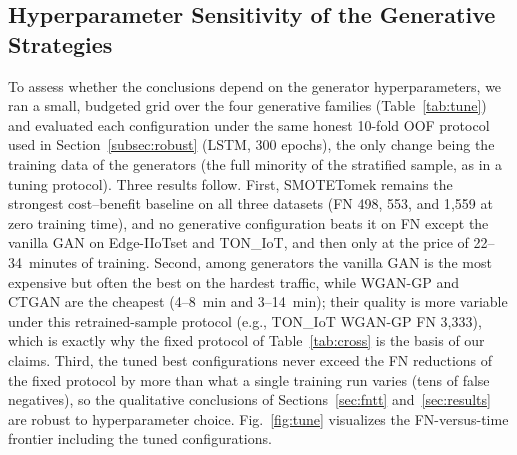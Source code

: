 ﻿\documentclass[journal]{IEEEtran}
\begin{document}
\subsection{Hyperparameter Sensitivity of the Generative Strategies}
\label{sec:tune}

To assess whether the conclusions depend on the generator hyperparameters, we ran a small, budgeted grid over the four generative families (Table~\ref{tab:tune}) and evaluated each configuration under the same honest 10-fold OOF protocol used in Section~\ref{subsec:robust} (LSTM, 300 epochs), the only change being the training data of the generators (the full minority of the stratified sample, as in a tuning protocol). Three results follow. First, SMOTETomek remains the strongest cost--benefit baseline on all three datasets (FN 498, 553, and 1{,}559 at zero training time), and no generative configuration beats it on FN except the vanilla GAN on Edge-IIoTset and TON\_IoT, and then only at the price of 22--34~minutes of training. Second, among generators the vanilla GAN is the most expensive but often the best on the hardest traffic, while WGAN-GP and CTGAN are the cheapest (4--8~min and 3--14~min); their quality is more variable under this retrained-sample protocol (e.g., TON\_IoT WGAN-GP FN 3{,}333), which is exactly why the fixed protocol of Table~\ref{tab:cross} is the basis of our claims. Third, the tuned best configurations never exceed the FN reductions of the fixed protocol by more than what a single training run varies (tens of false negatives), so the qualitative conclusions of Sections~\ref{sec:fntt} and~\ref{sec:results} are robust to hyperparameter choice. Fig.~\ref{fig:tune} visualizes the FN-versus-time frontier including the tuned configurations.
\end{document}
